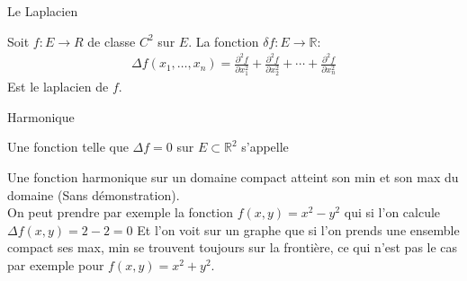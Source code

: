 \begin{parag}{Le Laplacien}
    \begin{definition}
        Soit $f: E \to R $ de classe $C^2$ sur $E$. La fonction $ \delta f: E \to \mathbb{R}$:
        \begin{align*}
            \Delta f(x_1, \dots, x_n) = \frac{\partial^2 f}{\partial x_1^2} + \frac{\partial^2 f}{\partial x_2^2} + \cdots  + \frac{\partial^2 f}{\partial x_n^2}
        \end{align*}
        Est le laplacien de $f$.
    \end{definition}
\end{parag}
\begin{parag}{Harmonique}
    \begin{definition}
    Une fonction telle que $ \Delta f = 0$ sur $E \subset \mathbb{R}^2$ s'appelle 
    \end{definition}
    
    Une fonction harmonique sur un domaine compact atteint son min et son max  du domaine (Sans démonstration).\\
    On peut prendre par exemple la fonction $f(x, y) = x^2 - y^2$ qui si l'on calcule $ \Delta f(x, y) = 2 -2 = 0$ Et l'on voit sur un graphe que si l'on prends une ensemble compact ses max, min se trouvent toujours sur la frontière, ce qui n'est pas le cas par exemple pour $f(x, y) = x^2 + y^2$.
\end{parag}



